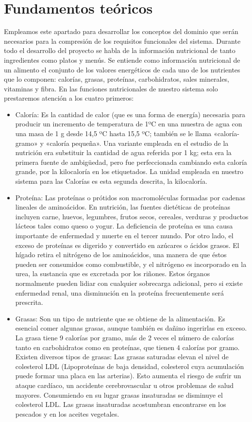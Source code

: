 \documentclass[12pt, a4paper, twoside]{book}
\begin{document}
	\chapter{Fundamentos teóricos}
	Empleamos este apartado para desarrollar los conceptos del dominio que serán necesarios para la compresión de los requisitos funcionales del sistema.
	Durante todo el desarrollo del proyecto se habla de la información nutricional de tanto ingredientes como platos y menús. Se entiende como información nutricional de un alimento el conjunto de los valores energéticos de cada uno de los nutrientes que lo componen: calorías, grasas, proteínas, carbohidratos, sales minerales, vitaminas y fibra. En las funciones nutricionales de nuestro sistema solo prestaremos atención a los cuatro primeros:
	\begin{itemize}
		\item Caloría: Es la cantidad de calor (que es una forma de energía) necesaria para producir un incremento de temperatura de 1ºC en una muestra de agua con una masa de 1 g desde 14,5 ºC hasta 15,5 ºC; también se le llama «caloría-gramo» y «caloría pequeña». Una variante empleada en el estudio de la nutrición era substituir la cantidad de agua referida por 1 kg; esta era la primera fuente de ambigüedad, pero fue perfeccionada cambiando esta caloría grande, por la kilocaloría en los etiquetados. La unidad empleada en nuestro sistema para las Calorías es esta segunda descrita, la kilocaloría.
		\item Proteína: Las proteínas o prótidos son macromoléculas formadas por cadenas lineales de aminoácidos. En nutrición, las fuentes dietéticas de proteínas incluyen carne, huevos, legumbres, frutos secos, cereales, verduras y productos lácteos tales como queso o yogur. La deficiencia de proteína es una causa importante de enfermedad y muerte en el tercer mundo. Por otro lado, el exceso de proteínas es digerido y convertido en azúcares o ácidos grasos. El hígado retira el nitrógeno de los aminoácidos, una manera de que éstos pueden ser consumidos como combustible, y el nitrógeno es incorporado en la urea, la sustancia que es excretada por los riñones. Estos órganos normalmente pueden lidiar con cualquier sobrecarga adicional, pero si existe enfermedad renal, una disminución en la proteína frecuentemente será prescrita.
		\item Grasas: Son un tipo de nutriente que se obtiene de la alimentación. Es esencial comer algunas grasas, aunque también es dañino ingerirlas en exceso. La grasa tiene 9 calorías por gramo, más de 2 veces el número de calorías tanto en carbohidratos como en proteínas, que tienen 4 calorías por gramo. Existen diversos tipos de grasas: Las grasas saturadas elevan el nivel de colesterol LDL (Lipoproteínas de baja densidad, colesterol cuya acumulación puede formar una placa en las arterias). Esto aumenta el riesgo de sufrir un ataque cardíaco, un accidente cerebrovascular u otros problemas de salud mayores. Consumiendo en su lugar grasas insaturadas se disminuye el colesterol LDL. Las grasas insaturadas acostumbran encontrarse en los pescados y en los aceites vegetales.

\end{itemize}
\end{document}
